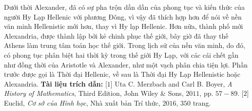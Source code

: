 \begin{multicols}{2}
	Dưới thời Alexander, đã có sự pha trộn dần dần của phong tục và kiến thức của người Hy Lạp Hellenic với phương Đông, vì vậy đã thích hợp hơn  để nói về nền văn minh Hellenistic mới hơn, thay vì Hy lạp Hellenic. 
	\vskip 0.1cm
	Hơn nữa, thành phố mới Alexandria, được thành lập bởi kẻ chinh phục thế giới, bây giờ đã thay thế Athens làm trung tâm toán học thế giới. 
	\vskip 0.1cm
	Trong lịch sử của nền văn minh, do đó, có phong tục phân biệt hai thời kỳ trong thế giới Hy Lạp, với các cái chết gần như đồng thời của Aristotle và Alexander, như một vạch phân chia tiện lợi. Phần trước được gọi là Thời đại Hellenic, về sau là Thời đại Hy Lạp Hellenistic hoặc Alexandria.
	\vskip 0.1cm
	\textbf{\color{lichsutoanhoc}Tài liệu trích dẫn:}
	\vskip 0.1cm
	[$1$] Uta C. Merzbach and Carl B. Boyer, \textit{A
	History of Mathematics}, Third Edition, John Wiley \& Sons, $2011$, pp. $57-89$.
	\vskip 0.1cm
	[$2$]  Euclid, \textit{Cơ sở của Hình học}, Nhà xuất bản Trí thức, $2016$, $350$ trang.
\end{multicols}

